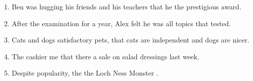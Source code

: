 \begin{enumerate}
\item \begin{inparaenum}[A]
Ben was hugging his friends and  his teachers   that he  the prestigious award. 
\end{inparaenum}

\item \begin{inparaenum}[A]
After  the examination for a year, Alex felt  he was  all topics that  tested. 
\end{inparaenum}

\item \begin{inparaenum}[A]
Cats and dogs   satisfactory pets,  that cats are  independent and dogs are nicer. 
\end{inparaenum}

\item \begin{inparaenum}[A]
The cashier  me that there  a sale on salad dressings   last week. 
\end{inparaenum}

\item \begin{inparaenum}[A]
Despite  popularity, the  the Loch Ness Monster  . 
\end{inparaenum}


\end{enumerate}
